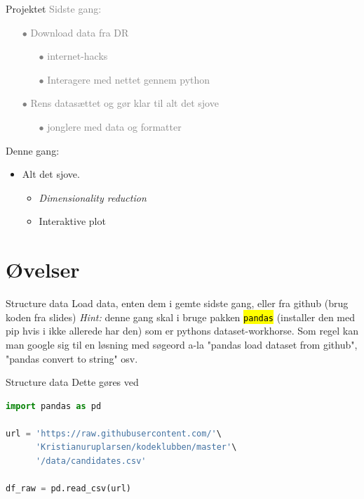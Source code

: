 \documentclass[10pt]{beamer}
\let\OldTexttt\texttt
\renewcommand{\texttt}[1]{\OldTexttt{\hl{#1}}}%
\begin{document}
\begin{frame}[fragile]{Projektet}
\textcolor{gray}{Sidste gang:}
\begin{itemize}
  \item[\textcolor{gray}{$\bullet$}] \textcolor{gray}{Download data fra DR}
  \begin{itemize}
    \item[\textcolor{gray}{$\bullet$}] \textcolor{gray}{internet-hacks}
    \item[\textcolor{gray}{$\bullet$}] \textcolor{gray}{Interagere med nettet gennem python}
  \end{itemize}
  \item[\textcolor{gray}{$\bullet$}] \textcolor{gray}{Rens datasættet og gør klar til alt det sjove}
  \begin{itemize}
    \item[\textcolor{gray}{$\bullet$}] \textcolor{gray}{jonglere med data og formatter}
  \end{itemize}
\end{itemize}

Denne gang:
\begin{itemize}
  \item Alt det sjove.
  \begin{itemize}
    \item \textit{Dimensionality reduction}
    \item Interaktive plot
  \end{itemize}
\end{itemize}
\end{frame}





\section{Øvelser}

\begin{frame}[fragile]{Structure data}
Load data, enten dem i gemte sidste gang, eller fra github (brug koden fra slides)
 \textit{Hint:} denne gang skal i bruge pakken \texttt{pandas} (installer den med pip hvis i ikke allerede har den) som er pythons dataset-workhorse. Som regel kan man google sig til en løsning med søgeord a-la "pandas load dataset from github", "pandas convert to string" osv.
\end{frame}

\begin{frame}[fragile]{Structure data}
Dette gøres ved
  \begin{lstlisting}[language=python]
import pandas as pd

url = 'https://raw.githubusercontent.com/'\
      'Kristianuruplarsen/kodeklubben/master'\
      '/data/candidates.csv'

df_raw = pd.read_csv(url)
\end{lstlisting}
\end{frame}
\end{document}
